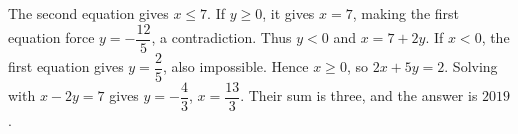 The second equation gives $x\le7$. If $y\ge0$, it gives $x=7$, making the first equation force $y=-\dfrac{12}{5}$, a contradiction. Thus $y<0$ and $x=7+2y$. If $x<0$, the first equation gives $y=\dfrac{2}{5}$, also impossible. Hence $x\ge0$, so $2x+5y=2$. Solving with $x-2y=7$ gives $y=-\dfrac{4}{3}$, $x=\dfrac{13}{3}$. Their sum is three, and the answer is $\boxed{2019}$.
